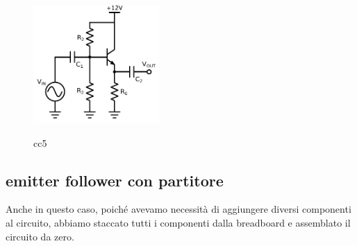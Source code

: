 \begin{figure}
	\caption{cc5}
	\includegraphics[height=45mm]{cc5.pdf}
	\label{fig:cc5}
\end{figure}

\subsection{emitter follower con partitore}
Anche in questo caso, poiché avevamo necessità di aggiungere diversi componenti al circuito, abbiamo staccato tutti i componenti dalla breadboard e assemblato il circuito da zero.
